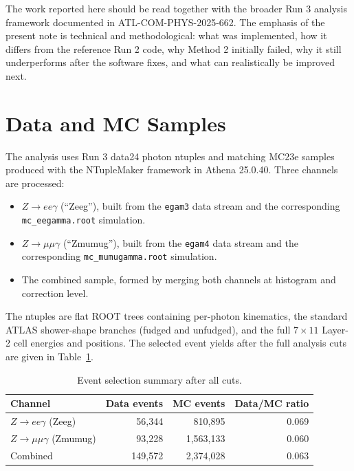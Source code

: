 \documentclass[11pt,a4paper]{article}
\begin{document}
The work reported here should be read together with the broader Run 3 analysis
framework documented in ATL-COM-PHYS-2025-662. The emphasis of the present note
is technical and methodological: what was implemented, how it differs from the
reference Run 2 code, why Method 2 initially failed, why it still underperforms
after the software fixes, and what can realistically be improved next.

\section{Data and MC Samples}

The analysis uses Run 3 data24 photon ntuples and matching MC23e samples
produced with the NTupleMaker framework in Athena 25.0.40. Three channels are
processed:

\begin{itemize}
  \item $Z \to ee\gamma$ (``Zeeg''), built from the \texttt{egam3} data stream
  and the corresponding \texttt{mc\_eegamma.root} simulation.
  \item $Z \to \mu\mu\gamma$ (``Zmumug''), built from the \texttt{egam4} data
  stream and the corresponding \texttt{mc\_mumugamma.root} simulation.
  \item The combined sample, formed by merging both channels at histogram and
  correction level.
\end{itemize}

The ntuples are flat ROOT trees containing per-photon kinematics, the standard
ATLAS shower-shape branches (fudged and unfudged), and the full $7 \times 11$
Layer-2 cell energies and positions. The selected event yields after the full
analysis cuts are given in Table~\ref{tab:event-yields}.

\begin{table}[H]
\centering
\caption{Event selection summary after all cuts.}
\label{tab:event-yields}
\begin{tabular}{lrrr}
\toprule
Channel & Data events & MC events & Data/MC ratio \\
\midrule
$Z \to ee\gamma$ (Zeeg) & 56,344 & 810,895 & 0.069 \\
$Z \to \mu\mu\gamma$ (Zmumug) & 93,228 & 1,563,133 & 0.060 \\
Combined & 149,572 & 2,374,028 & 0.063 \\
\bottomrule
\end{tabular}
\end{table}
\end{document}

